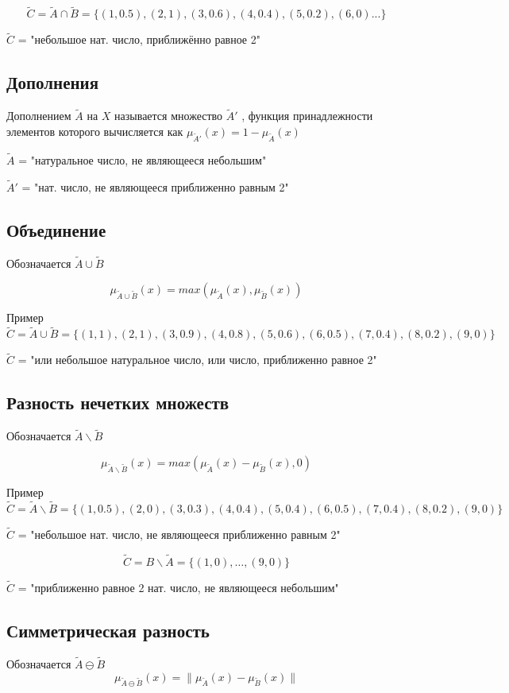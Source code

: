 				\[\tilde C = \tilde A \cap \tilde B = \{(1, 0.5), (2, 1), (3, 0.6), (4, 0.4), (5, 0.2), (6, 0) ...\}\]
				
				$\tilde C$ = "небольшое нат. число, приближённо равное 2"
			
		\subsection{Дополнения}
		    Дополнением $\tilde A$ на $X$ называется множество $\tilde A'$ , функция принадлежности элементов 
		    которого вычисляется как $\mu_{\tilde A'}(x) = 1 - \mu_{\tilde A}(x)$
		
			$\tilde A$ = "натуральное число, не являющееся небольшим"
			
			$\tilde A'$ = "нат. число, не являющееся приближенно равным 2"
		\subsection{Объединение}
		    Обозначается $\tilde A \cup \tilde B$
		
			\[\mu_{\tilde A \cup \tilde B}(x) = max(\mu_{\tilde A}(x), \mu_{\tilde B}(x))\]
			
			Пример
				\[\tilde C = \tilde A \cup \tilde B = \{(1, 1), (2, 1), (3, 0.9), (4, 0.8), (5, 0.6), (6, 0.5), (7, 0.4), (8, 0.2), (9, 0)\}\]
				
				$\tilde C$ = "или небольшое натуральное число, или число, приближенно равное 2"
				
		\subsection{Разность нечетких множеств}
		    Обозначается $\tilde A \backslash \tilde B$
		
			\[\mu_{\tilde A \backslash \tilde B}(x) = max(\mu_{\tilde A}(x) -  \mu_{\tilde B}(x), 0)\]
			
			Пример
			\[\tilde C = \tilde A \backslash \tilde B = \{(1, 0.5), (2, 0), (3, 0.3), (4, 0.4), (5, 0.4), (6, 0.5), (7, 0.4), (8, 0.2), (9, 0)\}\]
			
			$\tilde C$ = "небольшое нат. число, не являющееся приближенно равным 2"
			
			\[\tilde C = B \backslash \tilde A = \{(1, 0), \dots, (9, 0)\}\]
			
			$\tilde C$ = "приближенно равное 2 нат. число, не являющееся небольшим"
			
		\subsection{Симметрическая разность} 
		    Обозначается $\tilde A \ominus \tilde B$
			\[\mu_{\tilde A \ominus \tilde B}(x) = \|\mu_{\tilde A}(x) - \mu_{\tilde B}(x)\|\]
			
